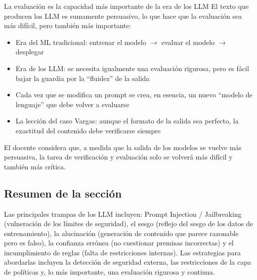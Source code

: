 \begin{importantbox}{La evaluación es la capacidad más importante de la era de los LLM}
El texto que producen los LLM es sumamente persuasivo, lo que hace que la evaluación sea más difícil, pero también más importante:
\begin{itemize}
    \item Era del ML tradicional: entrenar el modelo $\rightarrow$ evaluar el modelo $\rightarrow$ desplegar
    \item Era de los LLM: se necesita igualmente una evaluación rigurosa, pero es fácil bajar la guardia por la ``fluidez'' de la salida
    \item Cada vez que se modifica un prompt se crea, en esencia, un nuevo ``modelo de lenguaje'' que debe volver a evaluarse
    \item La lección del caso Vargas: aunque el formato de la salida sea perfecto, la exactitud del contenido debe verificarse siempre
\end{itemize}
El docente considera que, a medida que la salida de los modelos se vuelve más persuasiva, la tarea de verificación y evaluación solo se volverá más difícil y también más crítica.
\end{importantbox}

\subsection{Resumen de la sección}

Las principales trampas de los LLM incluyen: Prompt Injection / Jailbreaking (vulneración de los límites de seguridad), el sesgo (reflejo del sesgo de los datos de entrenamiento), la alucinación (generación de contenido que parece razonable pero es falso), la confianza errónea (no cuestionar premisas incorrectas) y el incumplimiento de reglas (falta de restricciones internas). Las estrategias para abordarlas incluyen la detección de seguridad externa, las restricciones de la capa de políticas y, lo más importante, una evaluación rigurosa y continua.

